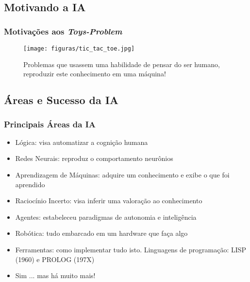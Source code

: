 \documentclass{beamer}
\begin{document}

\subsection{Motivando a IA}
\begin{frame}

\frametitle{Motivações aos \textit{Toys-Problem}}

\begin{figure}[ht!]
 \centering
 \texttt{[image: figuras/tic\_tac\_toe.jpg]}

\caption{Problemas que usassem uma habilidade de pensar do ser humano, reproduzir este conhecimento em uma máquina!}

\end{figure}


\end{frame}


\subsection{Áreas e Sucesso da IA}
\begin{frame}[fragile]
\frametitle{Principais Áreas da IA}
\begin{block}{}

  \begin{itemize}
   \item Lógica: visa automatizar a cognição humana

    \item Redes Neurais: reproduz o comportamento neurônios

    \item Aprendizagem de Máquinas: adquire um conhecimento e exibe o que foi aprendido

    \item Raciocínio Incerto: visa inferir uma valoração ao conhecimento

    \item Agentes: estabeleceu paradigmas de autonomia e inteligência
    
     \item Robótica: tudo embarcado em um hardware que faça algo
   
       \item Ferramentas: como implementar tudo isto. Linguagens de programação: LISP (1960) e PROLOG (197X)
       
     \item Sim ... mas há muito mais!
    \end{itemize}
  
\end{block}

\end{frame}
\end{document}
